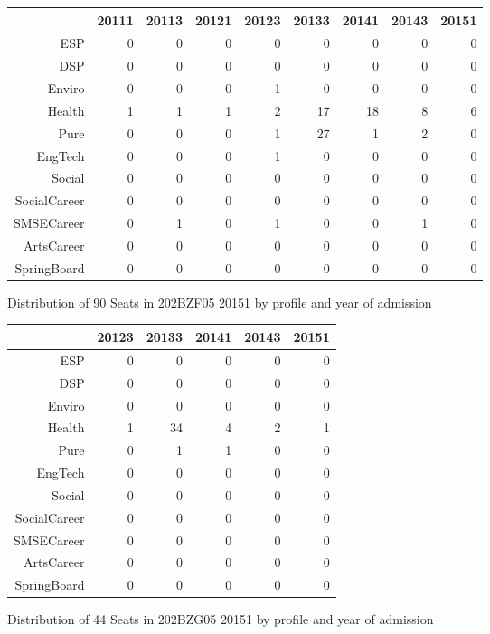 \documentclass{article}\usepackage[]{graphicx}\usepackage[]{color}
\begin{document}
\begin{figure}[H]
\centering
\begin{tabular}{rrrrrrrrr}
  \hline
 & 20111 & 20113 & 20121 & 20123 & 20133 & 20141 & 20143 & 20151 \\ 
  \hline
ESP &   0 &   0 &   0 &   0 &   0 &   0 &   0 &   0 \\ 
  DSP &   0 &   0 &   0 &   0 &   0 &   0 &   0 &   0 \\ 
  Enviro &   0 &   0 &   0 &   1 &   0 &   0 &   0 &   0 \\ 
  Health &   1 &   1 &   1 &   2 &  17 &  18 &   8 &   6 \\ 
  Pure &   0 &   0 &   0 &   1 &  27 &   1 &   2 &   0 \\ 
  EngTech &   0 &   0 &   0 &   1 &   0 &   0 &   0 &   0 \\ 
  Social &   0 &   0 &   0 &   0 &   0 &   0 &   0 &   0 \\ 
  SocialCareer &   0 &   0 &   0 &   0 &   0 &   0 &   0 &   0 \\ 
  SMSECareer &   0 &   1 &   0 &   1 &   0 &   0 &   1 &   0 \\ 
  ArtsCareer &   0 &   0 &   0 &   0 &   0 &   0 &   0 &   0 \\ 
  SpringBoard &   0 &   0 &   0 &   0 &   0 &   0 &   0 &   0 \\ 
   \hline
\end{tabular}
\caption{Distribution of 90 Seats in 202BZF05 20151 by profile and year of admission} 
\end{figure}
\begin{figure}[H]
\centering
\begin{tabular}{rrrrrr}
  \hline
 & 20123 & 20133 & 20141 & 20143 & 20151 \\ 
  \hline
ESP &   0 &   0 &   0 &   0 &   0 \\ 
  DSP &   0 &   0 &   0 &   0 &   0 \\ 
  Enviro &   0 &   0 &   0 &   0 &   0 \\ 
  Health &   1 &  34 &   4 &   2 &   1 \\ 
  Pure &   0 &   1 &   1 &   0 &   0 \\ 
  EngTech &   0 &   0 &   0 &   0 &   0 \\ 
  Social &   0 &   0 &   0 &   0 &   0 \\ 
  SocialCareer &   0 &   0 &   0 &   0 &   0 \\ 
  SMSECareer &   0 &   0 &   0 &   0 &   0 \\ 
  ArtsCareer &   0 &   0 &   0 &   0 &   0 \\ 
  SpringBoard &   0 &   0 &   0 &   0 &   0 \\ 
   \hline
\end{tabular}
\caption{Distribution of 44 Seats in 202BZG05 20151 by profile and year of admission} 
\end{figure}
\end{document}
